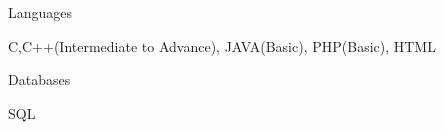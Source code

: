 

\begin{cventries}

  \cventry
  {}
    {Languages} %
    {} %
    {} %
    {
      \begin{cvitems} %
      \item {C,C++(Intermediate to Advance), JAVA(Basic), PHP(Basic), HTML}
      \end{cvitems}
    }

  \cventry
    {} %
    {Databases} %
    {} %
    {} %
    {
      \begin{cvitems} %
      \item {SQL}
      \end{cvitems}
    }



\end{cventries}
